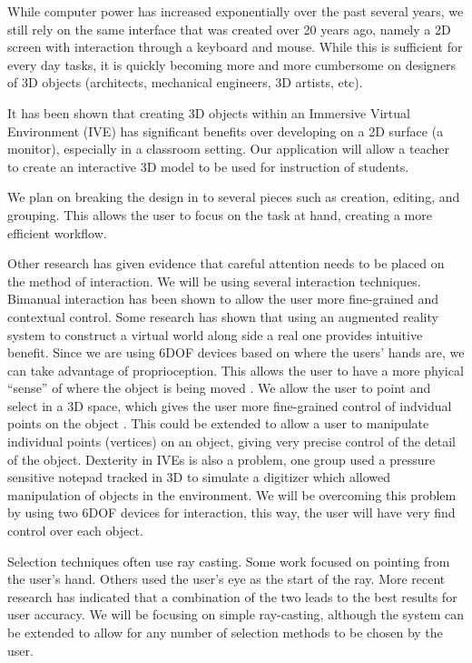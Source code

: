 While computer power has increased exponentially over the past several years, we still rely on the same interface that was created over 20 years ago, namely a 2D screen with interaction through a keyboard and mouse.
While this is sufficient for every day tasks, it is quickly becoming more and more cumbersome on designers of 3D objects (architects, mechanical engineers, 3D artists, etc)\cite{Dekker199242}.

It has been shown that creating 3D objects within an Immersive Virtual Environment (IVE) has significant benefits over developing on a 2D surface (a monitor)\cite{Kaufmann:Usability}, especially in a classroom setting\cite{Kaufmann:LearningGeometry}.
Our application will allow a teacher to create an interactive 3D model to be used for instruction of students.

We plan on breaking the design in to several pieces such as creation, editing, and grouping.
This allows the user to focus on the task at hand, creating a more efficient workflow\cite{Butterworth:1992:3DM}.

Other research has given evidence that careful attention needs to be placed on the method of interaction\cite{Bowman98interactiontechniques}.
We will be using several interaction techniques.
Bimanual interaction has been shown to allow the user more fine-grained and contextual control\cite{Zeleznik:1997:TPI:253284.253316}.
Some research has shown that using an augmented reality system to construct a virtual world along side a real one provides intuitive benefit\cite{Jota:2011:CVM:1979742.1979915}.
Since we are using 6DOF devices based on where the users' hands are, we can take advantage of proprioception.
This allows the user to have a more phyical ``sense'' of where the object is being moved \cite{Mine:MovingObjects}.
We allow the user to point and select in a 3D space, which gives the user more fine-grained control of indvidual points on the object \cite{5759472}.
This could be extended to allow a user to manipulate individual points (vertices) on an object, giving very precise control of the detail of the object.
Dexterity in IVEs is also a problem, one group used a pressure sensitive notepad tracked in 3D to simulate a digitizer which allowed manipulation of objects in the environment\cite{658467}.
We will be overcoming this problem by using two 6DOF devices for interaction, this way, the user will have very find control over each object.

Selection techniques often use ray casting.
Some work focused on pointing from the user's hand\cite{Mine:MovingObjects}.
Others used the user's eye as the start of the ray\cite{Pierce:1997:IPI:253284.253303}.
More recent research has indicated that a combination of the two leads to the best results for user accuracy\cite{5307641}.
We will be focusing on simple ray-casting, although the system can be extended to allow for any number of selection methods to be chosen by the user.

